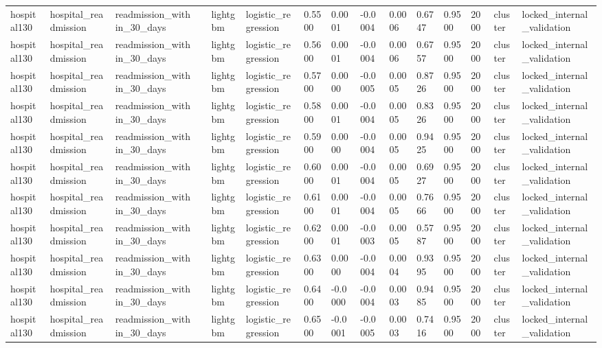 \begin{tabular}{lllllllllllllll}
hospital130 & hospital\_readmission & readmission\_within\_30\_days &  & lightgbm & logistic\_regression & 0.5500 & 0.0001 & -0.0004 & 0.0006 & 0.6747 & 0.9500 & 2000 & cluster & locked\_internal\_validation \\
hospital130 & hospital\_readmission & readmission\_within\_30\_days &  & lightgbm & logistic\_regression & 0.5600 & 0.0001 & -0.0004 & 0.0006 & 0.6757 & 0.9500 & 2000 & cluster & locked\_internal\_validation \\
hospital130 & hospital\_readmission & readmission\_within\_30\_days &  & lightgbm & logistic\_regression & 0.5700 & 0.0000 & -0.0005 & 0.0005 & 0.8726 & 0.9500 & 2000 & cluster & locked\_internal\_validation \\
hospital130 & hospital\_readmission & readmission\_within\_30\_days &  & lightgbm & logistic\_regression & 0.5800 & 0.0001 & -0.0004 & 0.0005 & 0.8326 & 0.9500 & 2000 & cluster & locked\_internal\_validation \\
hospital130 & hospital\_readmission & readmission\_within\_30\_days &  & lightgbm & logistic\_regression & 0.5900 & 0.0000 & -0.0004 & 0.0005 & 0.9425 & 0.9500 & 2000 & cluster & locked\_internal\_validation \\
hospital130 & hospital\_readmission & readmission\_within\_30\_days &  & lightgbm & logistic\_regression & 0.6000 & 0.0001 & -0.0004 & 0.0005 & 0.6927 & 0.9500 & 2000 & cluster & locked\_internal\_validation \\
hospital130 & hospital\_readmission & readmission\_within\_30\_days &  & lightgbm & logistic\_regression & 0.6100 & 0.0001 & -0.0004 & 0.0005 & 0.7666 & 0.9500 & 2000 & cluster & locked\_internal\_validation \\
hospital130 & hospital\_readmission & readmission\_within\_30\_days &  & lightgbm & logistic\_regression & 0.6200 & 0.0001 & -0.0003 & 0.0005 & 0.5787 & 0.9500 & 2000 & cluster & locked\_internal\_validation \\
hospital130 & hospital\_readmission & readmission\_within\_30\_days &  & lightgbm & logistic\_regression & 0.6300 & 0.0000 & -0.0004 & 0.0004 & 0.9395 & 0.9500 & 2000 & cluster & locked\_internal\_validation \\
hospital130 & hospital\_readmission & readmission\_within\_30\_days &  & lightgbm & logistic\_regression & 0.6400 & -0.0000 & -0.0004 & 0.0003 & 0.9485 & 0.9500 & 2000 & cluster & locked\_internal\_validation \\
hospital130 & hospital\_readmission & readmission\_within\_30\_days &  & lightgbm & logistic\_regression & 0.6500 & -0.0001 & -0.0005 & 0.0003 & 0.7416 & 0.9500 & 2000 & cluster & locked\_internal\_validation \\

\end{tabular}
